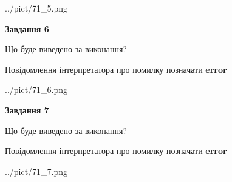 \documentclass[10pt, ukrainian]{article}
\begin{document}
{\begin {large}
\begin{center}
	{../pict/71_5.png}
\end{center}
\newpage

{\begin {center}\textbf{Завдання 6}\end {center}}\par
Що буде виведено за виконання? \par
Повідомлення інтерпретатора про помилку позначати \textbf{error}

\begin{center}
	{../pict/71_6.png}
\end{center}
\newpage

{\begin {center}\textbf{Завдання 7}\end {center}}\par
Що буде виведено за виконання? \par
Повідомлення інтерпретатора про помилку позначати \textbf{error}

\begin{center}
	{../pict/71_7.png}
\end{center}
\newpage

\end {large}}
\end{document}
